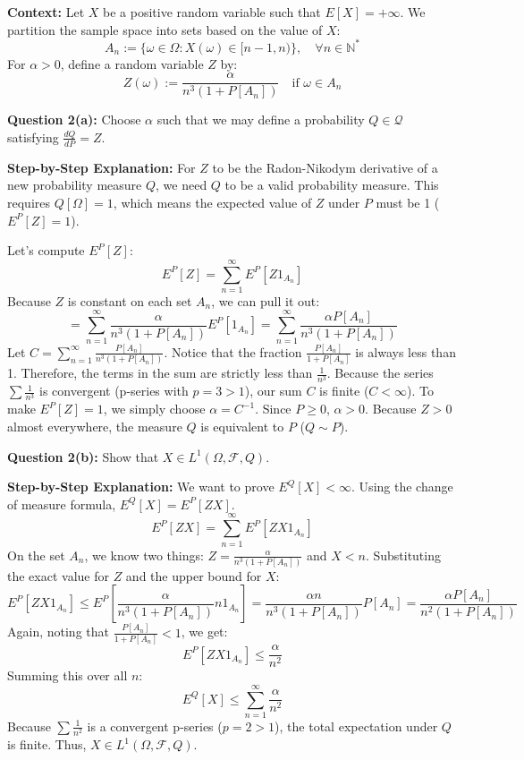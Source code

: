\textbf{Context:} Let $X$ be a positive random variable such that $E[X] = +\infty$. We partition the sample space into sets based on the value of $X$:
$$A_n := \{\omega \in \Omega : X(\omega) \in [n-1, n)\}, \quad \forall n \in \mathbb{N}^*$$
For $\alpha > 0$, define a random variable $Z$ by:
$$Z(\omega) := \frac{\alpha}{n^3(1 + P[A_n])} \quad \text{if } \omega \in A_n$$

\textbf{Question 2(a):} Choose $\alpha$ such that we may define a probability $Q \in \mathcal{Q}$ satisfying $\frac{dQ}{dP} = Z$.

\textbf{Step-by-Step Explanation:}
For $Z$ to be the Radon-Nikodym derivative of a new probability measure $Q$, we need $Q$ to be a valid probability measure. This requires $Q[\Omega] = 1$, which means the expected value of $Z$ under $P$ must be 1 ($E^P[Z] = 1$).

Let's compute $E^P[Z]$:
$$E^P[Z] = \sum_{n=1}^{\infty} E^P[Z 1_{A_n}]$$
Because $Z$ is constant on each set $A_n$, we can pull it out:
$$= \sum_{n=1}^{\infty} \frac{\alpha}{n^3(1 + P[A_n])} E^P[1_{A_n}] = \sum_{n=1}^{\infty} \frac{\alpha P[A_n]}{n^3(1 + P[A_n])}$$
Let $C = \sum_{n=1}^{\infty} \frac{P[A_n]}{n^3(1 + P[A_n])}$. Notice that the fraction $\frac{P[A_n]}{1 + P[A_n]}$ is always less than 1. Therefore, the terms in the sum are strictly less than $\frac{1}{n^3}$. Because the series $\sum \frac{1}{n^3}$ is convergent (p-series with $p=3>1$), our sum $C$ is finite ($C < \infty$).
To make $E^P[Z] = 1$, we simply choose $\alpha = C^{-1}$. Since $P \ge 0$, $\alpha > 0$. Because $Z > 0$ almost everywhere, the measure $Q$ is equivalent to $P$ ($Q \sim P$).

\textbf{Question 2(b):} Show that $X \in L^1(\Omega, \mathcal{F}, Q)$.

\textbf{Step-by-Step Explanation:}
We want to prove $E^Q[X] < \infty$. Using the change of measure formula, $E^Q[X] = E^P[ZX]$.
$$E^P[ZX] = \sum_{n=1}^{\infty} E^P[ZX 1_{A_n}]$$
On the set $A_n$, we know two things: $Z = \frac{\alpha}{n^3(1 + P[A_n])}$ and $X < n$.
Substituting the exact value for $Z$ and the upper bound for $X$:
$$E^P[ZX 1_{A_n}] \le E^P\left[\frac{\alpha}{n^3(1 + P[A_n])} n 1_{A_n}\right] = \frac{\alpha n}{n^3(1 + P[A_n])} P[A_n] = \frac{\alpha P[A_n]}{n^2(1 + P[A_n])}$$
Again, noting that $\frac{P[A_n]}{1 + P[A_n]} < 1$, we get:
$$E^P[ZX 1_{A_n}] \le \frac{\alpha}{n^2}$$
Summing this over all $n$:
$$E^Q[X] \le \sum_{n=1}^{\infty} \frac{\alpha}{n^2}$$
Because $\sum \frac{1}{n^2}$ is a convergent p-series ($p=2>1$), the total expectation under $Q$ is finite. Thus, $X \in L^1(\Omega, \mathcal{F}, Q)$.

